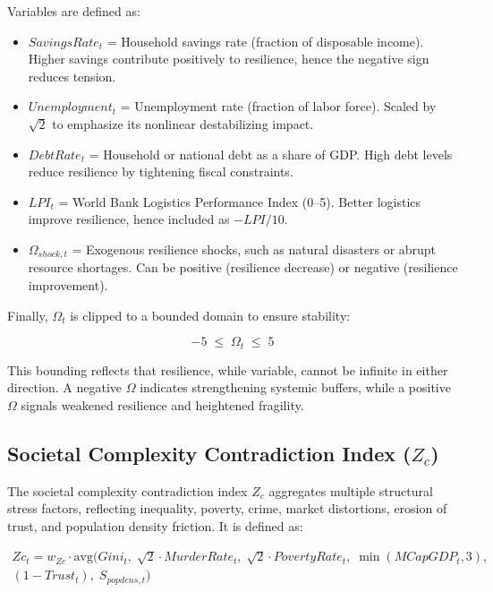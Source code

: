 \documentclass[12pt,a4paper]{article}
\begin{document}
\noindent Variables are defined as:
\begin{itemize}
    \item $SavingsRate_t$ = Household savings rate (fraction of disposable income). 
          Higher savings contribute positively to resilience, hence the negative sign reduces tension.
    \item $Unemployment_t$ = Unemployment rate (fraction of labor force). 
          Scaled by $\sqrt{2}$ to emphasize its nonlinear destabilizing impact.
    \item $DebtRate_t$ = Household or national debt as a share of GDP. 
          High debt levels reduce resilience by tightening fiscal constraints.
    \item $LPI_t$ = World Bank Logistics Performance Index (0–5). 
          Better logistics improve resilience, hence included as $-LPI/10$.
    \item $\Omega_{shock,t}$ = Exogenous resilience shocks, such as natural disasters or abrupt resource shortages. Can be positive (resilience decrease) or negative (resilience improvement).
\end{itemize}

\noindent Finally, $\Omega_t$ is clipped to a bounded domain to ensure stability:

\begin{equation}
-5 \; \leq \; \Omega_t \; \leq \; 5
\end{equation}

\noindent This bounding reflects that resilience, while variable, cannot be infinite 
in either direction. A negative $\Omega$ indicates strengthening systemic buffers, 
while a positive $\Omega$ signals weakened resilience and heightened fragility.
\subsection{Societal Complexity Contradiction Index (\texorpdfstring{$Z_c$}{Zc})}

The societal complexity contradiction index $Z_c$ aggregates multiple structural 
stress factors, reflecting inequality, poverty, crime, market distortions, erosion 
of trust, and population density friction. It is defined as:

\begin{multline}
Zc_t = w_{Zc} \cdot \mathrm{avg}\Big( Gini_t,\; \sqrt{2} \cdot MurderRate_t,\; 
\sqrt{2} \cdot PovertyRate_t,\; \min(MCapGDP_t,3), \\
(1 - Trust_t),\; S_{popdens,t} \Big)
\end{multline}
\end{document}
